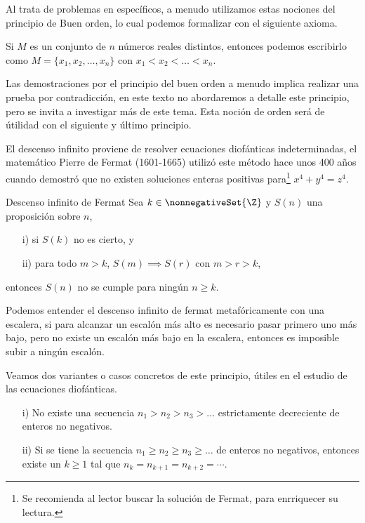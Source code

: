 Al trata de problemas en específicos, a menudo utilizamos estas nociones del principio de Buen orden, lo cual podemos
formalizar con el siguiente axioma.
\begin{axiom}
    Si $M$ es un conjunto de $n$ números reales distintos, entonces podemos escribirlo como $M = \{x_1,x_2,\ldots,x_n\}$
    con $x_1 < x_2 < \ldots < x_n$.
\end{axiom}
Las demostraciones por el principio del buen orden a menudo implica realizar una prueba por contradicción, en este texto
no abordaremos a detalle este principio, pero se invita a investigar más de este tema.
Esta noción de orden será de útilidad con el siguiente y último principio.

El descenso infinito proviene de resolver ecuaciones diofánticas indeterminadas, el matemático Pierre de Fermat
(1601-1665) utilizó este método hace unos 400 años cuando demostró que no existen soluciones enteras positivas
para\footnote{Se recomienda al lector buscar la solución de Fermat, para enrriquecer su lectura.} $x^4 + y^4 = z^4$.

\begin{principle.box}{Descenso infinito de Fermat}{}
    Sea $k \in \nonnegativeSet{\Z}$ y $S(n)$ una proposición sobre $n$,
    \begin{enumerate}
        \item[i)] si $S(k)$ no es cierto, y
        \item[ii)] para todo $m > k$, $S(m) \implies S(r)$ con $m > r > k$,
    \end{enumerate}
    entonces $S(n)$ no se cumple para ningún $n\geq k$.
\end{principle.box}
Podemos entender el descenso infinito de fermat metafóricamente con una escalera, si para alcanzar un escalón más alto es necesario
pasar primero uno más bajo, pero no existe un escalón más bajo en la escalera, entonces es imposible subir a ningún escalón.

Veamos dos variantes o casos concretos de este principio, útiles en el estudio de las ecuaciones diofánticas.
\begin{enumerate}
    \item[i)] No existe una secuencia $n_1 > n_2 > n_3 > \ldots$ estrictamente decreciente de enteros no negativos.
    \item[ii)] Si se tiene la secuencia $n_1\geq n_2 \geq n_3 \geq \ldots$ de enteros no negativos, entonces existe un $k \geq 1$ tal que $n_k = n_{k+1} = n_{k + 2} = \cdots$.
\end{enumerate}

